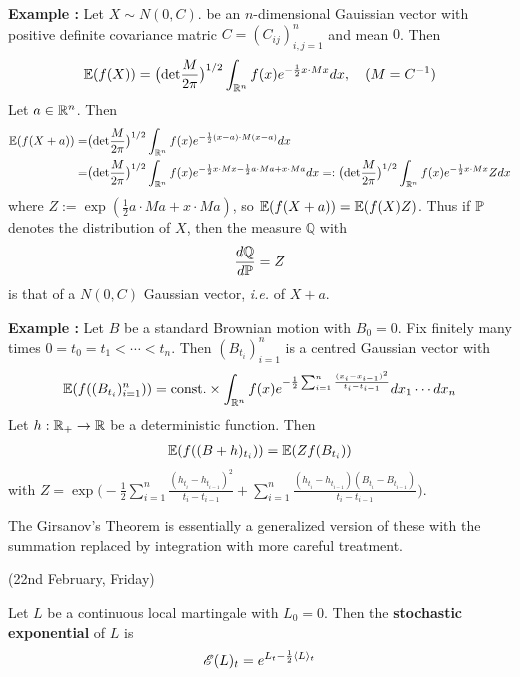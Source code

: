 \documentclass[12pt,a4paper]{article}
\begin{document}
\textbf{Example :} Let $X\sim N(0, C)$. be an $n$-dimensional Gauissian vector with positive definite covariance matric $C= (C_{ij})_{i,j=1}^n$ and mean $0$. Then
\begin{align*}
\mathbb{E} (f(X)) = \big( \text{det} \frac{M}{2\pi} \big)^{1/2} \int_{\mathbb{R}^n} f(x) e^{-\frac{1}{2} x\cdot M x} dx, \quad (M = C^{-1})
\end{align*}
Let $a\in \mathbb{R}^n$. Then 
\begin{align*}
\mathbb{E} (f(X+a)) =& \big( \text{det} \frac{M}{2\pi} \big)^{1/2} \int_{\mathbb{R}^n} f(x) e^{-\frac{1}{2} (x-a)\cdot M (x-a)} dx \\
=& \big( \text{det} \frac{M}{2\pi} \big)^{1/2} \int_{\mathbb{R}^n} f(x) e^{- \frac{1}{2} x\cdot Mx - \frac{1}{2} a\cdot Ma + x\cdot M a} dx =: \big( \text{det} \frac{M}{2\pi} \big)^{1/2} \int_{\mathbb{R}^n} f(x) e^{- \frac{1}{2} x\cdot Mx} Z dx
\end{align*}
where $Z := \exp (\frac{1}{2} a\cdot Ma + x\cdot M a)$, so $\mathbb{E} (f(X+a)) = \mathbb{E} (f(X) Z)$. Thus if $\mathbb{P}$ denotes the distribution of $X$, then the measure $\mathbb{Q}$ with
\begin{align*}
\frac{d\mathbb{Q}}{d\mathbb{P}} = Z
\end{align*}
is that of a $N(0, C)$ Gaussian vector, \textit{i.e.} of $X+a$.
\s

\textbf{Example :} Let $B$ be a standard Brownian motion with $B_0 =0$. Fix finitely many times $0=t_0 = t_1 < \cdots < t_n$. Then $(B_{t_i})_{i=1}^n$ is a centred Gaussian vector with
\begin{align*}
\mathbb{E} (f((B_{t_i})_{i=1}^n)) = \text{const.} \times \int_{\mathbb{R}^n} f(x)e^{-\frac{1}{2} \sum_{i=1}^n \frac{(x_i - x_{i-1})^2}{t_i -t_{i-1}}} dx_1 \cdots dx_n 
\end{align*}
Let $h: \mathbb{R}_+ \rightarrow \mathbb{R}$ be a deterministic function. Then
\begin{align*}
\mathbb{E} (f((B + h)_{t_i})) = \mathbb{E}(Z f(B_{t_i}))
\end{align*}
with $Z= \exp \big( -\frac{1}{2}\sum_{i=1}^n \frac{(h_{t_i} - h_{t_{i-1}})^2}{t_i - t_{i-1}} + \sum_{i=1}^n \frac{(h_{t_i} - h_{t_{i-1}})(B_{t_i} - B_{t_{i-1}})}{t_i - t_{i-1}} \big)$.
\s

The Girsanov's Theorem is essentially a generalized version of these with the summation replaced by integration with more careful treatment.
\s

\newday

(22nd February, Friday)
\s

 Let $L$ be a continuous local martingale with $L_0 =0$. Then the \textbf{stochastic exponential} of $L$ is
\begin{align*}
\mathscr{E} (L)_t = e^{L_t - \frac{1}{2} \langle L \rangle_t}
\end{align*}
\end{document}
